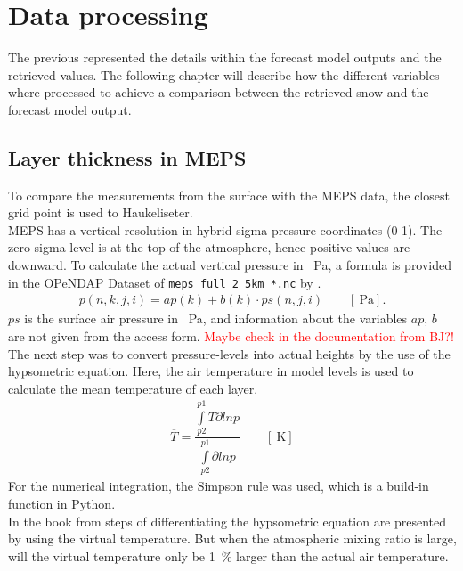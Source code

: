 \chapter{Data processing} \label{ch:data_proc}
The previous  represented the details within the forecast model outputs and the retrieved values. The following chapter will describe how the different variables where processed to achieve a comparison between the retrieved snow and the forecast model output. 

\section{Layer thickness in MEPS}
To compare the measurements from the surface with the MEPS data, the closest grid point is used to Haukeliseter.
\\
MEPS has a vertical resolution in hybrid sigma pressure coordinates (0-1). The zero sigma level is at the top of the atmosphere, hence positive values are downward. To calculate the actual vertical pressure in \SI{}{\Pa}, a formula is provided in the OPeNDAP Dataset of \texttt{meps\_full\_2\_5km\_*.nc} by \cite{norwegian_meteorological_institute_met_2016}.  
\begin{align}
p(n,k,j,i) = ap(k) + b(k) \cdot ps(n,j,i) \qquad [\SI{}{\Pa}].
\label{eq:hybrid_sigma_pressure}
\end{align}
$ps$ is the surface air pressure in \SI{}{\Pa}, and information about the variables $ap$, $b$ are not given from the access form. \textcolor{red}{Maybe check in the documentation from BJ?!}  
\\
The next step was to convert pressure-levels into actual heights by the use of the hypsometric equation. Here, the air temperature in model levels is used to calculate the mean temperature of each layer. 
\begin{align}
\overline{T} = \dfrac{\int\limits_{p2}^{p1} T \partial ln p}{\int\limits_{p2}^{p1}\partial ln p} \qquad [\SI{}{\kelvin}]
\label{eq:T_avg}
\end{align}
For the numerical integration, the Simpson rule was used, which is a build-in function in Python. \\
In the book from \cite{martin_mid-latitude_2006} steps of differentiating the hypsometric equation are presented by using the virtual temperature. But when the atmospheric mixing ratio is large, will the virtual temperature only be \SI{1}{\percent} larger than the actual air temperature. 
